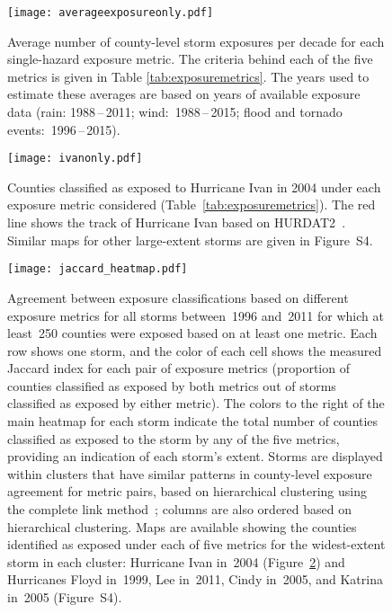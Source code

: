 \clearpage

\begin{figure}%
\centering
\texttt{[image: averageexposureonly.pdf]} 
\caption{Average number of county-level storm exposures per decade for each
	single-hazard exposure metric. The criteria behind each of the five
	metrics is given in Table \ref{tab:exposuremetrics}. The years used to
	estimate these averages are based on years of available exposure data
	(rain: 1988\,--\,2011; wind:~1988\,--\,2015; flood and
	tornado events:~1996\,--\,2015). } 
\label{fig:averageexposure} 
\end{figure}

\clearpage

\begin{figure}%
\centering
\texttt{[image: ivanonly.pdf]}
\caption{Counties classified as exposed to Hurricane Ivan in 2004 under each
	exposure metric considered (Table~\ref{tab:exposuremetrics}). The red
	line shows the track of Hurricane Ivan based on
	\ac{HURDAT2}~\parencite{landsea2013}.  Similar maps for other
	large-extent storms are given in Figure~S4.
	}
\label{fig:ivanexposure} 
\end{figure}

\clearpage

\begin{figure}%
\centering 
\texttt{[image: jaccard\_heatmap.pdf]} 
\caption{Agreement between exposure classifications based on different
         exposure metrics for all storms between~1996 and~2011 for which 
	 at least~250 counties were exposed based on at least one metric.
	 Each row shows one storm, and the color of each cell shows the 
	 measured Jaccard index for each pair of exposure metrics 
	 (proportion of counties classified as exposed by both metrics out 
	 of storms classified as exposed by either metric). The colors to the 
	 right of the main heatmap for each storm indicate the total number of 
	 counties classified as exposed to the storm by any of the five metrics, 
	 providing an indication of each storm's extent. Storms are displayed 
	 within clusters that have similar patterns in county-level exposure 
	 agreement for metric pairs, based on hierarchical clustering using the 
	 complete link method~\parencite{murtagh2012algorithms}; columns are also 
	 ordered based on hierarchical clustering. Maps are available showing the 
	 counties identified as exposed under each of five metrics for the widest-extent 
	 storm in each cluster: Hurricane Ivan in~2004 (Figure~\ref{fig:ivanexposure}) 
	 and Hurricanes Floyd in~1999, Lee in~2011, Cindy in~2005, and Katrina 
	 in~2005 (Figure~S4).
} 
\label{fig:jaccard}
\end{figure}

